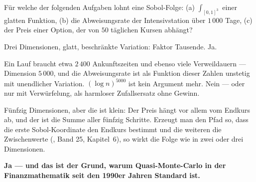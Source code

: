 \begin{aufgabe}
Für welche der folgenden Aufgaben lohnt eine Sobol-Folge: (a) $\int_{[0,1]^3}$ einer glatten Funktion, (b) die Abweisungsrate der Intensivstation über $1\,000$ Tage, (c) der Preis einer Option, der von $50$ täglichen Kursen abhängt?

\loesung
{}
Drei Dimensionen, glatt, beschränkte Variation: Faktor Tausende. Ja.

Ein Lauf braucht etwa $2\,400$ Ankunftszeiten und ebenso viele Verweildauern --- Dimension $5\,000$, und die Abweisungsrate ist als Funktion dieser Zahlen unstetig mit unendlicher Variation. $(\log n)^{5000}$ ist kein Argument mehr. Nein --- oder nur mit Verwürfelung, als harmloser Zufallsersatz ohne Gewinn.

Fünfzig Dimensionen, aber die  ist klein: Der Preis hängt vor allem vom Endkurs ab, und der ist die Summe aller fünfzig Schritte. Erzeugt man den Pfad so, dass die erste Sobol-Koordinate den Endkurs bestimmt und die weiteren die Zwischenwerte (, Band 25, Kapitel~6), so wirkt die Folge wie in zwei oder drei Dimensionen.

\begin{center}
\begin{minipage}{0.9\textwidth}
\textbf{Ja --- und das ist der Grund, warum Quasi-Monte-Carlo in der Finanzmathematik seit den 1990er Jahren Standard ist.}
\end{minipage}
\end{center}

\begin{center}
\begin{minipage}{0.88\textwidth}
\end{minipage}
\end{center}
\end{aufgabe}

